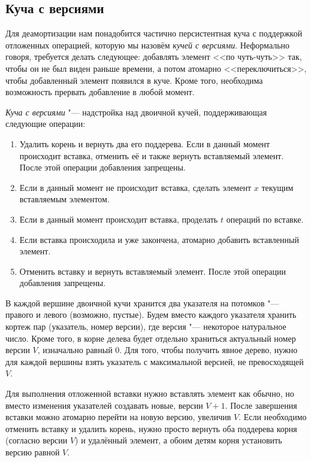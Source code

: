 \subsection{Куча с версиями} \label{heap-with-versions}
Для деамортизации нам понадобится частично персистентная куча с поддержкой
отложенных операцией, которую мы назовём \emph{кучей с версиями}.
Неформально говоря, требуется делать следующее: добавлять элемент <<по чуть-чуть>>
так, чтобы он не был виден раньше времени, а потом атомарно <<переключиться>>,
чтобы добавленный элемент появился в куче. Кроме того, необходима возможность
прервать добавление в любой момент.

\begin{definition}
\emph{Куча с версиями} "--- надстройка над двоичной кучей,
поддерживающая следующие операции:
\begin{enumerate}
\item Удалить корень и вернуть два его поддерева. Если в данный момент происходит
    вставка, отменить её и также вернуть вставляемый элемент. После этой операции
    добавления запрещены.
\item Если в данный момент не происходит вставка, сделать элемент $x$
    текущим вставляемым элементом.
\item Если в данный момент происходит вставка, проделать $t$ операций по вставке.
\item Если вставка происходила и уже закончена, атомарно добавить вставленный элемент.
\item Отменить вставку и вернуть вставляемый элемент. После этой операции
    добавления запрещены.
\end{enumerate}
\end{definition}

В каждой вершине двоичной кучи хранится два указателя на потомков "--- правого
и левого (возможно, пустые). Будем вместо каждого указателя хранить кортеж
пар (указатель, номер версии), где версия "--- некоторое натуральное число.
Кроме того, в корне делева будет отдельно храниться актуальный номер версии $V$,
изначально равный $0$.
Для того, чтобы получить явное дерево, нужно для каждой вершины взять
указатель с максимальной версией, не превосходящей $V$.

Для выполнения отложенной вставки нужно вставлять элемент как обычно, но вместо
изменения указателей создавать новые, версии $V+1$. После завершения вставки
можно атомарно перейти на новую версию, увеличив $V$. Если необходимо отменить
вставку и удалить корень, нужно просто вернуть оба поддерева корня (согласно версии
$V$) и удалённый элемент, а обоим детям корня установить версию равной $V$.

